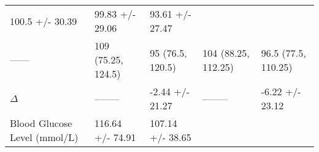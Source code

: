 \documentclass[]{article}
\begin{document}
\begin{longtable}[]{@{}lllll@{}}
\begin{minipage}[t]{0.18\columnwidth}
100.5 +/- 30.39\strut
\end{minipage} & \begin{minipage}[t]{0.18\columnwidth}\raggedright
99.83 +/- 29.06\strut
\end{minipage} & \begin{minipage}[t]{0.15\columnwidth}\raggedright
93.61 +/- 27.47\strut
\end{minipage}\tabularnewline
\begin{minipage}[t]{0.15\columnwidth}\raggedright
------\strut
\end{minipage} & \begin{minipage}[t]{0.20\columnwidth}\raggedright
109 (75.25, 124.5)\strut
\end{minipage} & \begin{minipage}[t]{0.18\columnwidth}\raggedright
95 (76.5, 120.5)\strut
\end{minipage} & \begin{minipage}[t]{0.18\columnwidth}\raggedright
104 (88.25, 112.25)\strut
\end{minipage} & \begin{minipage}[t]{0.15\columnwidth}\raggedright
96.5 (77.5, 110.25)\strut
\end{minipage}\tabularnewline
\begin{minipage}[t]{0.15\columnwidth}\raggedright
\(\Delta\)\strut
\end{minipage} & \begin{minipage}[t]{0.20\columnwidth}\raggedright
--------\strut
\end{minipage} & \begin{minipage}[t]{0.18\columnwidth}\raggedright
-2.44 +/- 21.27\strut
\end{minipage} & \begin{minipage}[t]{0.18\columnwidth}\raggedright
--------\strut
\end{minipage} & \begin{minipage}[t]{0.15\columnwidth}\raggedright
-6.22 +/- 23.12\strut
\end{minipage}\tabularnewline
\begin{minipage}[t]{0.15\columnwidth}\raggedright
Blood Glucose Level (mmol/L)\strut
\end{minipage} & \begin{minipage}[t]{0.20\columnwidth}\raggedright
116.64 +/- 74.91\strut
\end{minipage} & \begin{minipage}[t]{0.18\columnwidth}\raggedright
107.14 +/- 38.65\strut
\end{minipage} & \begin{minipage}[t]{0.18\columnwidth}\raggedright

\end{minipage}
\end{longtable}
\end{document}
